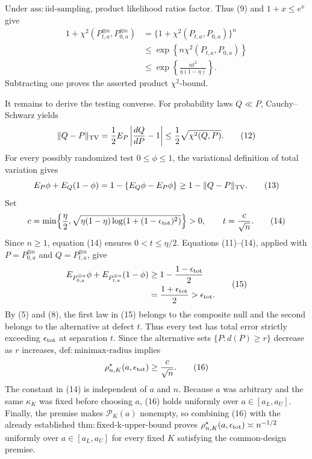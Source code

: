 Under \(\mathrm{ass:iid\mbox{-}sampling}\), product likelihood ratios factor. Thus (9) and \(1+x\le e^x\) give
\[
\begin{aligned}
1+\chi^2(P_{t,a}^{\otimes n},P_{0,a}^{\otimes n})
&=\{1+\chi^2(P_{t,a},P_{0,a})\}^n\\
&\le\exp\!\left\{n\chi^2(P_{t,a},P_{0,a})\right\}\\
&\le\exp\!\left\{\frac{nt^2}{\eta(1-\eta)}\right\}.
\end{aligned} \tag{11}
\]
Subtracting one proves the asserted product \(\chi^2\)-bound.

It remains to derive the testing converse. For probability laws \(Q\ll P\), Cauchy--Schwarz yields
\[
\|Q-P\|_{\rm TV}
=\frac12E_P\left|\frac{dQ}{dP}-1\right|
\le\frac12\sqrt{\chi^2(Q,P)}. \tag{12}
\]
For every possibly randomized test \(0\le\phi\le1\), the variational definition of total variation gives
\[
E_P\phi+E_Q(1-\phi)
=1-\{E_Q\phi-E_P\phi\}
\ge1-\|Q-P\|_{\rm TV}. \tag{13}
\]
Set
\[
c=\min\!\left\{\frac\eta2,
\sqrt{\eta(1-\eta)\log\!\left(1+(1-\epsilon_{\rm tot})^2\right)}\right\}>0,
\qquad
t=\frac{c}{\sqrt n}. \tag{14}
\]
Since \(n\ge1\), equation (14) ensures \(0<t\le\eta/2\). Equations (11)--(14), applied with \(P=P_{0,a}^{\otimes n}\) and \(Q=P_{t,a}^{\otimes n}\), give
\[
\begin{aligned}
E_{P_{0,a}^{\otimes n}}\phi+E_{P_{t,a}^{\otimes n}}(1-\phi)
&\ge1-\frac{1-\epsilon_{\rm tot}}2\\
&=\frac{1+\epsilon_{\rm tot}}2
>\epsilon_{\rm tot}. 
\end{aligned} \tag{15}
\]
By (5) and (8), the first law in (15) belongs to the composite null and the second belongs to the alternative at defect \(t\). Thus every test has total error strictly exceeding \(\epsilon_{\rm tot}\) at separation \(t\). Since the alternative sets \(\{P:d(P)\ge r\}\) decrease as \(r\) increases, \(\mathrm{def:minimax\mbox{-}radius}\) implies
\[
\rho^\star_{n,K}(a,\epsilon_{\rm tot})\ge\frac{c}{\sqrt n}. \tag{16}
\]
The constant in (14) is independent of \(a\) and \(n\). Because \(a\) was arbitrary and the same \(\kappa_K\) was fixed before choosing \(a\), (16) holds uniformly over \(a\in[a_L,a_U]\). Finally, the premise makes \(\mathcal P_K(a)\) nonempty, so combining (16) with the already established \(\mathrm{thm:fixed\mbox{-}k\mbox{-}upper\mbox{-}bound}\) proves \(\rho^\star_{n,K}(a,\epsilon_{\rm tot})\asymp n^{-1/2}\) uniformly over \(a\in[a_L,a_U]\) for every fixed \(K\) satisfying the common-design premise.
